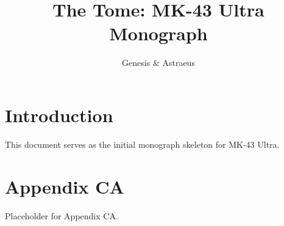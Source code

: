 \documentclass{book}
\begin{document}
\title{The Tome: MK-43 Ultra Monograph}
\author{Genesis \& Astraeus}
\maketitle

\tableofcontents


\chapter{Introduction}
This document serves as the initial monograph skeleton for MK-43 Ultra.

\appendix
\chapter{Appendix CA}
Placeholder for Appendix CA.
\end{document}
